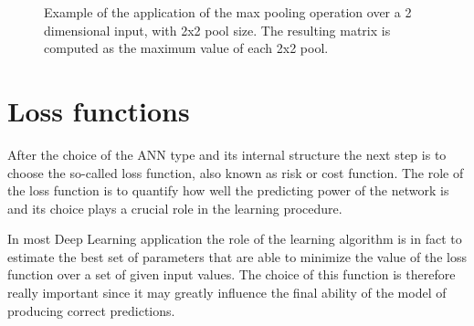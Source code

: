 \begin{figure}[h]
    \centering
     
    \caption{Example of the application of the max pooling operation over a 2 dimensional input, with 2x2 pool size. The resulting matrix is computed as the maximum value of each 2x2 pool.}
    \label{fig:cnn_pool}
\end{figure}


%  


\section{Loss functions} \label{lossfunction}

After the choice of the ANN type and its internal structure the next step is to choose the so-called loss function, also known as risk or cost function. The role of the loss function is to quantify how well the predicting power of the network is and its choice plays a crucial role in the learning procedure.

In most Deep Learning application the role of the learning algorithm is in fact to estimate the best set of parameters that are able to minimize the value of the loss function over a set of given input values. The choice of this function is therefore really important since it may greatly influence the final ability of the model of producing correct predictions.

